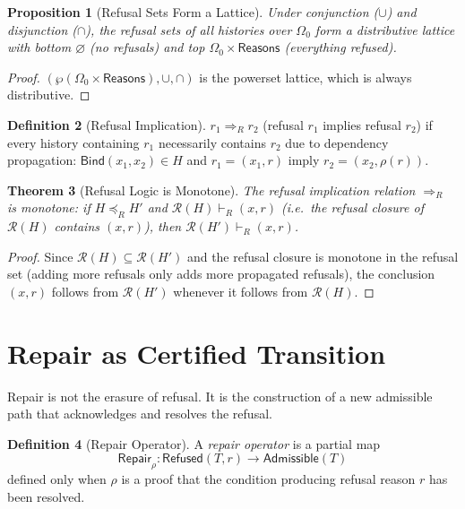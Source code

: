 \documentclass[12pt, a4paper, openany]{book}
\theoremstyle{plain}
\newtheorem{theorem}{Theorem}[chapter]
\newtheorem{proposition}[theorem]{Proposition}
\theoremstyle{definition}
\newtheorem{definition}[theorem]{Definition}
\theoremstyle{remark}
\newcommand{\Bind}{\mathsf{Bind}}
\newcommand{\calR}{\mathcal{R}}
\newcommand{\Adm}{\mathsf{Admissible}}
\newcommand{\Rfsd}{\mathsf{Refused}}
\begin{document}
\begin{proposition}[Refusal Sets Form a Lattice]
Under conjunction ($\cup$) and disjunction ($\cap$), the refusal sets of all
histories over $\Omega_0$ form a distributive lattice with bottom $\varnothing$
(no refusals) and top $\Omega_0 \times \mathsf{Reasons}$ (everything refused).
\end{proposition}

\begin{proof}
$(\wp(\Omega_0 \times \mathsf{Reasons}), \cup, \cap)$ is the powerset lattice,
which is always distributive.
\end{proof}

\begin{definition}[Refusal Implication]
$r_1 \Rightarrow_R r_2$ (refusal $r_1$ implies refusal $r_2$) if every history
containing $r_1$ necessarily contains $r_2$ due to dependency propagation:
$\Bind(x_1, x_2) \in H$ and $r_1 = (x_1, r)$ imply $r_2 = (x_2, \rho(r))$.
\end{definition}

\begin{theorem}[Refusal Logic is Monotone]
The refusal implication relation $\Rightarrow_R$ is monotone: if $H \preceq_R H'$
and $\calR(H) \vdash_R (x, r)$ (i.e.\ the refusal closure of $\calR(H)$
contains $(x,r)$), then $\calR(H') \vdash_R (x, r)$.
\end{theorem}

\begin{proof}
Since $\calR(H) \subseteq \calR(H')$ and the refusal closure is monotone in
the refusal set (adding more refusals only adds more propagated refusals),
the conclusion $(x, r)$ follows from $\calR(H')$ whenever it follows from
$\calR(H)$.
\end{proof}

\section{Repair as Certified Transition}

Repair is not the erasure of refusal. It is the construction of a new admissible
path that acknowledges and resolves the refusal.

\begin{definition}[Repair Operator]
A \emph{repair operator} is a partial map
\[
\mathsf{Repair}_\rho : \Rfsd(T, r) \to \Adm(T)
\]
defined only when $\rho$ is a proof that the condition producing refusal
reason $r$ has been resolved.
\end{definition}
\end{document}
